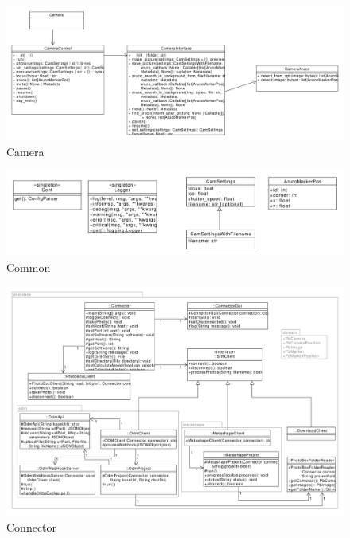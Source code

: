 \documentclass[./00PhotoBox.tex]{subfiles}
\begin{document}
\begin{figure}[!htbp]
    \centering
    \includegraphics[width=1\textwidth]{./img/uml/uml_camera_classdiagramm.pdf}
    \centering
    \caption{Camera} %
    \label{img:uml_camera} %
\end{figure}

\begin{figure}[!htbp]
    \centering
    \includegraphics[width=1\textwidth]{./img/uml/uml_common_classdiagramm.pdf}
    \centering
    \caption{Common} %
    \label{img:uml_common} %
\end{figure}

\begin{figure}[!htbp]
    \centering
    \includegraphics[width=1\textwidth]{./img/uml/uml_connector_classdiagramm.pdf}
    \centering
    \caption{Connector} %
    \label{img:uml_connector} %
\end{figure}
\end{document}
